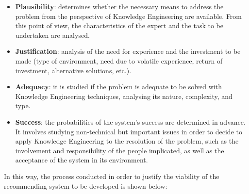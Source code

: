 \begin{itemize}
\item \textbf{Plausibility}: determines whether the necessary means to address the problem from the perspective of Knowledge Engineering are available. From this point of view, the characteristics of the expert and the task to be undertaken are analysed.
\item \textbf{Justification}: analysis of the need for experience and the investment to be made (type of environment, need due to volatile experience, return of investment, alternative solutions, etc.).
\item \textbf{Adequacy}: it is studied if the problem is adequate to be solved with Knowledge Engineering techniques, analysing its nature, complexity, and type.
\item \textbf{Success}: the probabilities of the system's success are determined in advance. It involves studying non-technical but important issues in order to decide to apply Knowledge Engineering to the resolution of the problem, such as the involvement and responsibility of the people implicated, as well as the acceptance of the system in its environment.
\end{itemize}

In this way, the process conducted in order to justify the viability of the recommending system to be developed is shown below:

